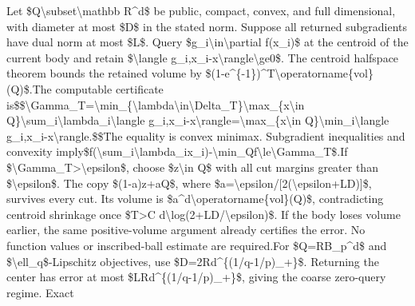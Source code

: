 \documentclass[10pt,a4paper]{article}
\begin{document}
\begingroup\raggedright\sloppy Let \$Q\textbackslash{}subset\textbackslash{}mathbb R\textasciicircum{}d\$ be public,\allowbreak{} compact,\allowbreak{} convex,\allowbreak{} and full dimensional,\allowbreak{} with diameter at most \$D\$ in the stated norm. Suppose all returned subgradients have dual norm at most \$L\$. Query \$g\_\allowbreak{}i\textbackslash{}in\textbackslash{}partial f(x\_\allowbreak{}i)\$ at the centroid of the current body and retain \$\textbackslash{}langle g\_\allowbreak{}i,\allowbreak{}x\_\allowbreak{}i-x\textbackslash{}rangle\textbackslash{}ge0\$. The centroid halfspace theorem bounds the retained volume by \$(1-e\textasciicircum{}\{-1\})\textasciicircum{}T\textbackslash{}operatorname\{vol\}(Q)\$.\newline{}\newline{}The computable certificate is\newline{}\$\$\newline{}\textbackslash{}Gamma\_\allowbreak{}T=\allowbreak{}\textbackslash{}min\_\allowbreak{}\{\textbackslash{}lambda\textbackslash{}in\textbackslash{}Delta\_\allowbreak{}T\}\textbackslash{}max\_\allowbreak{}\{x\textbackslash{}in Q\}\textbackslash{}sum\_\allowbreak{}i\textbackslash{}lambda\_\allowbreak{}i\textbackslash{}langle g\_\allowbreak{}i,\allowbreak{}x\_\allowbreak{}i-x\textbackslash{}rangle\newline{}=\allowbreak{}\textbackslash{}max\_\allowbreak{}\{x\textbackslash{}in Q\}\textbackslash{}min\_\allowbreak{}i\textbackslash{}langle g\_\allowbreak{}i,\allowbreak{}x\_\allowbreak{}i-x\textbackslash{}rangle.\newline{}\$\$\newline{}The equality is convex minimax. Subgradient inequalities and convexity imply\newline{}\$f(\textbackslash{}sum\_\allowbreak{}i\textbackslash{}lambda\_\allowbreak{}ix\_\allowbreak{}i)-\textbackslash{}min\_\allowbreak{}Qf\textbackslash{}le\textbackslash{}Gamma\_\allowbreak{}T\$.\newline{}If \$\textbackslash{}Gamma\_\allowbreak{}T>\textbackslash{}epsilon\$,\allowbreak{} choose \$z\textbackslash{}in Q\$ with all cut margins greater than \$\textbackslash{}epsilon\$. The copy \$(1-a)z+aQ\$,\allowbreak{} where \$a=\allowbreak{}\textbackslash{}epsilon/\allowbreak{}[2(\textbackslash{}epsilon+LD)]\$,\allowbreak{} survives every cut. Its volume is \$a\textasciicircum{}d\textbackslash{}operatorname\{vol\}(Q)\$,\allowbreak{} contradicting centroid shrinkage once \$T>C d\textbackslash{}log(2+LD/\allowbreak{}\textbackslash{}epsilon)\$. If the body loses volume earlier,\allowbreak{} the same positive-volume argument already certifies the error. No function values or inscribed-ball estimate are required.\newline{}\newline{}For \$Q=\allowbreak{}RB\_\allowbreak{}p\textasciicircum{}d\$ and \$\textbackslash{}ell\_\allowbreak{}q\$-Lipschitz objectives,\allowbreak{} use \$D=\allowbreak{}2Rd\textasciicircum{}\{(1/\allowbreak{}q-1/\allowbreak{}p)\_\allowbreak{}+\}\$. Returning the center has error at most \$LRd\textasciicircum{}\{(1/\allowbreak{}q-1/\allowbreak{}p)\_\allowbreak{}+\}\$,\allowbreak{} giving the coarse zero-query regime. Exact 
\end{document}
